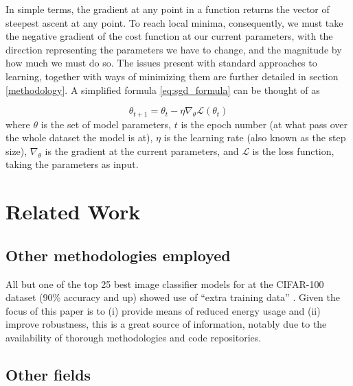 \documentclass[conference]{IEEEtran}
\begin{document}
In simple terms, the gradient at any point in a function returns the vector of steepest ascent at any point. To reach local minima, consequently, we must take the negative gradient of the cost function at our current parameters, with the direction representing the parameters we have to change, and the magnitude by how much we must do so. The issues present with standard approaches to learning, together with ways of minimizing them are further detailed in section \ref{methodology}. A simplified formula \eqref{eq:sgd_formula} can be thought of as

\begin{equation}
    \theta_{t+1} = \theta_t - \eta \nabla_{\theta} \mathcal{L}(\theta_t)
    \label{eq:sgd_formula}
\end{equation}
where $\theta$ is the set of model parameters, $t$ is the epoch number (at what pass over the whole dataset the model is at), $\eta$ is the learning rate (also known as the step size), $\nabla_\theta$ is the gradient at the current parameters, and $\mathcal{L}$ is the loss function, taking the parameters as input. 

\section{Related Work} \label {related}

\subsection{Other methodologies employed}
All but one of the top 25 best image classifier models for at the CIFAR-100 dataset (90\% accuracy and up) showed use of ``extra training data'' \cite{SOTApwcIC}. Given the focus of this paper is to (i) provide means of reduced energy usage and (ii) improve robustness, this is a great source of information, notably due to the availability of thorough methodologies and code repositories.

\subsection{Other fields}
\end{document}
